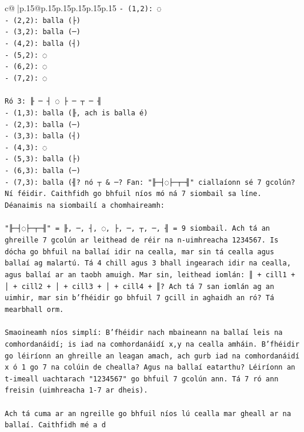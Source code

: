 \documentclass{article}
\begin{document}
{\begin{supertabular}{c@{$\;$}|p{.15\linewidth}@{}p{.15\linewidth}p{.15\linewidth}p{.15\linewidth}p{.15\linewidth}p{.15\linewidth}}
{{{\texttt{{-} (1,2): ◌} \\
\texttt{{-} (2,2): balla (├)} \\
\texttt{{-} (3,2): balla (─)} \\
\texttt{{-} (4,2): balla (┤)} \\
\texttt{{-} (5,2): ◌} \\
\texttt{{-} (6,2): ◌} \\
\texttt{{-} (7,2): ◌} \\
\\ 
\texttt{Ró 3: ╟ ─ ┤ ◌ ├ ─ ┬ ─ ╢} \\
\texttt{{-} (1,3): balla (╟, ach is balla é)} \\
\texttt{{-} (2,3): balla (─)} \\
\texttt{{-} (3,3): balla (┤)} \\
\texttt{{-} (4,3): ◌} \\
\texttt{{-} (5,3): balla (├)} \\
\texttt{{-} (6,3): balla (─)} \\
\texttt{{-} (7,3): balla (╢? nó ┬ \& ─? Fan: "╟─┤◌├─┬─╢" ciallaíonn sé 7 gcolún? Ní féidir. Caithfidh go bhfuil níos mó ná 7 siombail sa líne. Déanaimis na siombailí a chomhaireamh:} \\
\\ 
\texttt{"╟─┤◌├─┬─╢" = ╟, ─, ┤, ◌, ├, ─, ┬, ─, ╢ = 9 siombail. Ach tá an ghreille 7 gcolún ar leithead de réir na n{-}uimhreacha 1234567. Is dócha go bhfuil na ballaí idir na cealla, mar sin tá cealla agus ballaí ag malartú. Tá 4 chill agus 3 bhall ingearach idir na cealla, agus ballaí ar an taobh amuigh. Mar sin, leithead iomlán: ║ + cill1 + │ + cill2 + │ + cill3 + │ + cill4 + ║? Ach tá 7 san iomlán ag an uimhir, mar sin b'fhéidir go bhfuil 7 gcill in aghaidh an ró? Tá mearbhall orm.} \\
\\ 
\texttt{Smaoineamh níos simplí: B'fhéidir nach mbaineann na ballaí leis na comhordanáidí; is iad na comhordanáidí x,y na cealla amháin. B'fhéidir go léiríonn an ghreille an leagan amach, ach gurb iad na comhordanáidí x ó 1 go 7 na colúin de chealla? Agus na ballaí eatarthu? Léiríonn an t{-}imeall uachtarach "1234567" go bhfuil 7 gcolún ann. Tá 7 ró ann freisin (uimhreacha 1{-}7 ar dheis).} \\
\\ 
\texttt{Ach tá cuma ar an ngreille go bhfuil níos lú cealla mar gheall ar na ballaí. Caithfidh mé a d} \\
            }
        }
    }
     \\ \\


\end{supertabular}}
\end{document}
